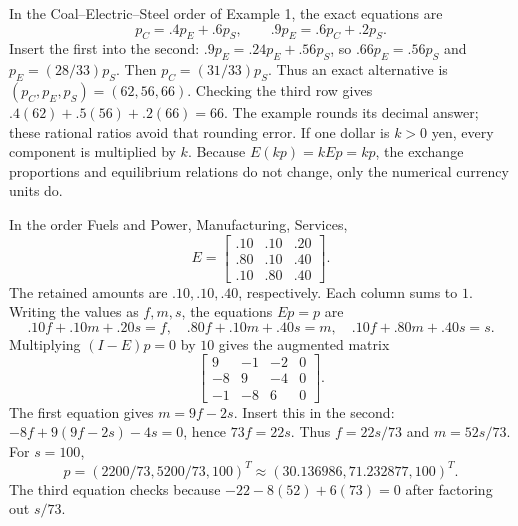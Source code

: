 In the Coal--Electric--Steel order of Example 1, the exact equations are
\[p_C=.4p_E+.6p_S,\qquad .9p_E=.6p_C+.2p_S.\]
Insert the first into the second:
$.9p_E=.24p_E+.56p_S$, so $.66p_E=.56p_S$ and
$p_E=(28/33)p_S$. Then $p_C=(31/33)p_S$.
Thus an exact alternative is $(p_C,p_E,p_S)=(62,56,66)$.
Checking the third row gives $.4(62)+.5(56)+.2(66)=66$.
The example rounds its decimal answer; these rational ratios avoid that
rounding error.
If one dollar is $k>0$ yen, every component is multiplied by $k$.
Because $E(kp)=kEp=kp$, the exchange proportions and equilibrium
relations do not change, only the numerical currency units do.

In the order Fuels and Power, Manufacturing, Services,
\[E=\begin{bmatrix}.10&.10&.20\\.80&.10&.40\\.10&.80&.40\end{bmatrix}.\]
The retained amounts are $.10,.10,.40$, respectively. Each column sums to $1$.
Writing the values as $f,m,s$, the equations $Ep=p$ are
\[.10f+.10m+.20s=f,\quad .80f+.10m+.40s=m,
\quad .10f+.80m+.40s=s.\]
Multiplying $(I-E)p=0$ by $10$ gives the augmented matrix
\[\left[\begin{array}{rrr|r}9&-1&-2&0\\-8&9&-4&0\\-1&-8&6&0\end{array}\right].\]
The first equation gives $m=9f-2s$. Insert this in the second:
$-8f+9(9f-2s)-4s=0$, hence $73f=22s$.
Thus $f=22s/73$ and $m=52s/73$.
For $s=100$,
\[p=(2200/73,5200/73,100)^T
\approx(30.136986,71.232877,100)^T.\]
The third equation checks because $-22-8(52)+6(73)=0$ after
factoring out $s/73$.

